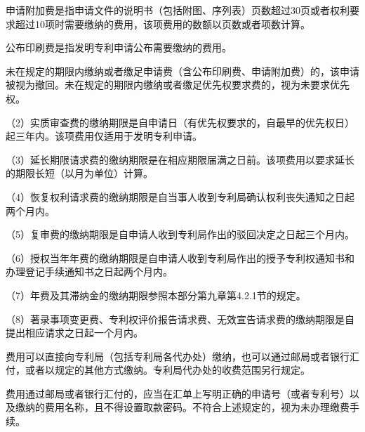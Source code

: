 申请附加费是指申请文件的说明书（包括附图、序列表）页数超过30页或者权利要求超过10项时需要缴纳的费用，该项费用的数额以页数或者项数计算。

公布印刷费是指发明专利申请公布需要缴纳的费用。

未在规定的期限内缴纳或者缴足申请费（含公布印刷费、申请附加费）的，该申请被视为撤回。未在规定的期限内缴纳或者缴足优先权要求费的，视为未要求优先权。

{\setlength{\parindent}{17.1bp}（2）实质审查费的缴纳期限是自申请日（有优先权要求的，自最早的优先权日）起三年内。该项费用仅适用于发明专利申请。\par}

{\setlength{\parindent}{17.1bp}（3）延长期限请求费的缴纳期限是在相应期限届满之日前。该项费用以要求延长的期限长短（以月为单位）计算。\par}

{\setlength{\parindent}{17.1bp}（4）恢复权利请求费的缴纳期限是自当事人收到专利局确认权利丧失通知之日起两个月内。\par}

{\setlength{\parindent}{17.1bp}（5）复审费的缴纳期限是自申请人收到专利局作出的驳回决定之日起三个月内。\par}

{\setlength{\parindent}{17.1bp}（6）授权当年年费的缴纳期限是自申请人收到专利局作出的授予专利权通知书和办理登记手续通知书之日起两个月内。\par}

{\setlength{\parindent}{17.1bp}（7）年费及其滞纳金的缴纳期限参照本部分第九章第4.2.1节的规定。\par}

{\setlength{\parindent}{17.1bp}（8）著录事项变更费、专利权评价报告请求费、无效宣告请求费的缴纳期限是自提出相应请求之日起一个月内。\par}

费用可以直接向专利局（包括专利局各代办处）缴纳，也可以通过邮局或者银行汇付，或者以规定的其他方式缴纳。专利局代办处的收费范围另行规定。

费用通过邮局或者银行汇付的，应当在汇单上写明正确的申请号（或者专利号）以及缴纳的费用名称，且不得设置取款密码。不符合上述规定的，视为未办理缴费手续。

